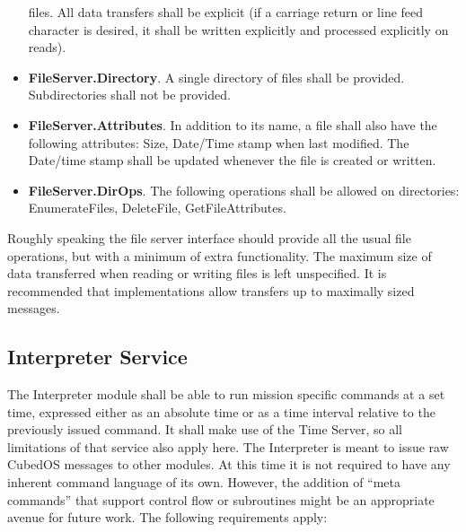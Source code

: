\begin{itemize}
  files. All data transfers shall be explicit (if a carriage return or line feed character is
  desired, it shall be written explicitly and processed explicitly on reads).
\item \textbf{FileServer.Directory}. A single directory of files shall be provided.
  Subdirectories shall not be provided.
\item \textbf{FileServer.Attributes}. In addition to its name, a file shall also have the
  following attributes: Size, Date/Time stamp when last modified. The Date/time stamp shall be
  updated whenever the file is created or written.
\item \textbf{FileServer.DirOps}. The following operations shall be allowed on directories:
  EnumerateFiles, DeleteFile, GetFileAttributes.
\end{itemize}

Roughly speaking the file server interface should provide all the usual file operations, but
with a minimum of extra functionality. The maximum size of data transferred when reading or
writing files is left unspecified. It is recommended that implementations allow transfers up to
maximally sized messages.


\subsection{Interpreter Service}
\label{sec:interpreter-service}

The Interpreter module shall be able to run mission specific commands at a set time, expressed
either as an absolute time or as a time interval relative to the previously issued command. It
shall make use of the Time Server, so all limitations of that service also apply here. The
Interpreter is meant to issue raw CubedOS messages to other modules. At this time it is not
required to have any inherent command language of its own. However, the addition of ``meta
commands'' that support control flow or subroutines might be an appropriate avenue for future
work. The following requirements apply:

